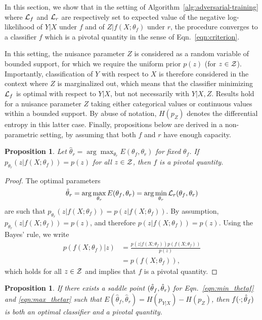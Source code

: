 \documentclass[twocolumn,superscriptaddress,aps]{revtex4-1}
\theoremstyle{plain}
\newtheorem{proposition}[theorem]{Proposition}
\begin{document}
In this section, we show that in the setting of
Algorithm~\ref{alg:adversarial-training} where ${\cal L}_f$ and ${\cal L}_r$ are
respectively set to expected value of the negative log-likelihood of $Y|X$ under
$f$ and of $Z|f(X;\theta_f)$ under $r$, the procedure converges to a classifier
$f$ which is a pivotal quantity in the sense of Eqn.~\ref{eqn:criterion}.

In this setting, the nuisance parameter $Z$ is considered as a random variable
of bounded support, for which we require the uniform prior $p(z)$ (for $z \in
{\cal Z}$). Importantly, classification of $Y$ with respect to $X$ is therefore
considered in the context where $Z$ is marginalized out, which means that the
classifier minimizing ${\cal L}_f$ is optimal with respect to $Y|X$, but not
necessarily with $Y|X,Z$. Results hold for a nuisance parameter $Z$ taking
either categorical values or continuous values within a bounded support. By
abuse of notation, $H(p_Z)$ denotes the differential entropy in this latter
case. Finally, propositions below are derived in a non-parametric setting, by
assuming that both $f$ and $r$ have enough capacity.

\begin{proposition}\label{prop:1}
Let $\hat\theta_r = \arg \max_{\theta_r} E(\theta_f,
\theta_r)$ for fixed $\theta_f$. If $p_{\theta_r}(z|f(X;\theta_f)) = p(z)$
for all $z \in {\cal Z}$, then $f$ is a pivotal quantity.
\end{proposition}

\begin{proof}
The optimal parameters $$\smash{\hat\theta}_r =
\arg \max_{\theta_r} E(\theta_f, \theta_r) = \arg \min_{\theta_r} {\cal L}_r(\theta_f,
\theta_r)$$ are such that $p_{\theta_r}(z|f(X;\theta_f)) = p(z|f(X;\theta_f))$.
By assumption, $p_{\theta_r}(z|f(X;\theta_f)) = p(z)$,
and therefore $p(z|f(X;\theta_f)) = p(z)$.
Using the Bayes' rule, we write
\begin{align*}
    p(f(X;\theta_f)|z) &= \frac{ p(z|f(X;\theta_f)) p(f(X;\theta_f)) } { p(z)}\\
                       &= p(f(X;\theta_f)),
\end{align*}
which holds for all $z \in {\cal Z}$ and implies that $f$ is a pivotal quantity.
\end{proof}

\begin{proposition}\label{prop:2}
If there exists a saddle point $(\smash{\hat\theta}_f, \smash{\hat\theta}_r)$
for Eqn.~\ref{eqn:min_thetaf} and \ref{eqn:max_thetar} such that
$E(\hat\theta_f, \hat\theta_r) = H(p_{Y|X}) - H(p_Z)$, then
$f(\cdot;\smash{\hat\theta}_f)$ is both an optimal classifier and a pivotal
quantity.
\end{proposition}
\end{document}
